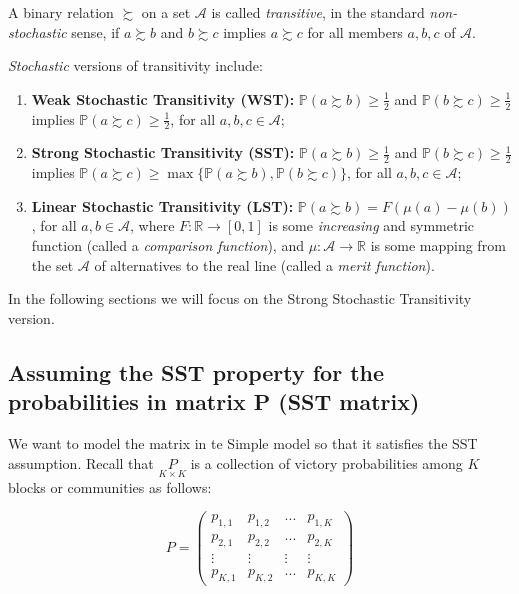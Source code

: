 \documentclass[11pt]{amsart}
\begin{document}
A binary relation $\succsim$ on a set $\mathcal{A}$ is called \emph{transitive}, in the standard \textit{non-stochastic} sense, if
$a \succsim b$ and $b \succsim c$ implies $a \succsim c$ for all members $a,b,c$ of $\mathcal{A}$.

\emph{Stochastic} versions of transitivity include:
\begin{enumerate}
  \item \textbf{Weak Stochastic Transitivity (WST):} $\mathbb{P}(a\succsim b)\geq \tfrac{1}{2}$ and $\mathbb{P}(b\succsim c)\geq \tfrac{1}{2}$ implies $\mathbb{P}(a\succsim c)\geq \tfrac{1}{2}$, for all $a,b,c \in \mathcal{A}$;
  \item \textbf{Strong Stochastic Transitivity (SST):} $\mathbb{P}(a\succsim b)\geq \tfrac{1}{2}$ and $\mathbb{P}(b\succsim c)\geq \tfrac{1}{2}$ implies $\mathbb{P}(a\succsim c)\geq \max \{\mathbb{P}(a\succsim b),\mathbb{P}(b\succsim c)\}$, for all $a,b,c \in \mathcal{A}$;
  \item \textbf{Linear Stochastic Transitivity (LST):} $\mathbb{P}(a\succsim b) = F(\mu(a) - \mu(b))$, for all $a,b \in \mathcal{A}$, where $F:\mathbb{R} \to [0,1]$ is some \textit{increasing} and symmetric function (called a \emph{comparison function}), and $\mu: \mathcal{A}\to \mathbb{R}$ is some mapping from the set $\mathcal{A}$ of alternatives to the real line (called a \emph{merit function}).
\end{enumerate}

In the following sections we will focus on the Strong Stochastic Transitivity version.

\subsection{Assuming the SST property for the probabilities in matrix P (SST matrix)}
We want to model the matrix in te Simple model so that it satisfies the SST assumption. Recall that $\underset{K \times K}{P}$ is a collection of victory probabilities among $K$ blocks or communities as follows:

\begin{center}
$$P = 
\left(\begin{array}{cccc}p_{1,1} & p_{1,2} &  ... & p_{1,K} \\ p_{2,1} & p_{2,2} & ... & p_{2,K} \\ \vdots & \vdots & \vdots & \vdots \\ p_{K,1}& p_{K,2 }& ... & p_{K,K}\end{array}\right)$$
\end{center}
\end{document}

